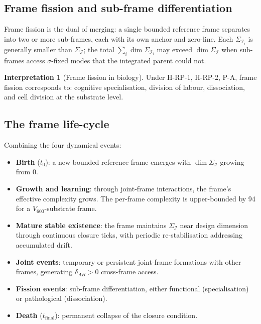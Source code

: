 \documentclass[11pt]{article}
\theoremstyle{plain}
\theoremstyle{definition}
\newtheorem{interpretation}[theorem]{Interpretation}
\theoremstyle{remark}
\newcommand{\Ical}{\mathcal{I}}
\begin{document}
\subsection{Frame fission and sub-frame differentiation}

Frame fission is the dual of merging: a single bounded reference frame separates into two or more sub-frames, each with its own anchor and zero-line. Each $\Sigma_{\Ical_i}$ is generally smaller than $\Sigma_\Ical$; the total $\sum_i \dim \Sigma_{\Ical_i}$ may exceed $\dim \Sigma_\Ical$ when sub-frames access $\sigma$-fixed modes that the integrated parent could not.

\begin{interpretation}[Frame fission in biology]\label{int:fission}
Under H-RP-1, H-RP-2, P-A, frame fission corresponds to: cognitive specialisation, division of labour, dissociation, and cell division at the substrate level.
\end{interpretation}

\subsection{The frame life-cycle}

Combining the four dynamical events:

\begin{itemize}[leftmargin=2em]
\item \textbf{Birth} ($t_0$): a new bounded reference frame emerges with $\dim \Sigma_\Ical$ growing from 0.
\item \textbf{Growth and learning}: through joint-frame interactions, the frame's effective complexity grows. The per-frame complexity is upper-bounded by 94 for a $V_{600}$-substrate frame.
\item \textbf{Mature stable existence}: the frame maintains $\Sigma_\Ical$ near design dimension through continuous closure ticks, with periodic re-stabilisation addressing accumulated drift.
\item \textbf{Joint events}: temporary or persistent joint-frame formations with other frames, generating $\delta_{AB} > 0$ cross-frame access.
\item \textbf{Fission events}: sub-frame differentiation, either functional (specialisation) or pathological (dissociation).
\item \textbf{Death} ($t_{\text{final}}$): permanent collapse of the closure condition.
\end{itemize}
\end{document}
